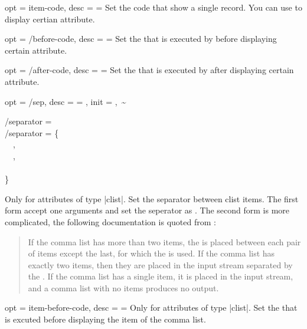 \documentclass[full]{l3doc}
\begin{document}
\begin{documentation}
\begin{option}{
  opt = item-code,
  desc = {= }
}
  Set the code that show a single record. You can use  to display
  certian attribute.
\end{option}

\begin{option}{
  opt = {/before-code},
  desc = {= }
}
  Set the  that is executed by  before displaying
  certain attribute.
\end{option}

\begin{option}{
  opt = {/after-code},
  desc = {= }
}
  Set the  that is executed by  after displaying
  certain attribute.
\end{option}

\begin{option}{
  opt = {/sep},
  desc = {= },
  init = {,~\~}
}
\begin{Syntax}
  /separator =  \\
  /separator = \{ \\
  ~~, \\
  ~~, \\
  ~~ \\
  \}
\end{Syntax}

  Only for attributes of type |clist|. Set the separator between clist items.
  The first form accept one arguments and set the seperator as . The
  second form is more complicated, the following documentation is quoted from
  :
  \begin{quote}
    If the comma list has more than two items, the  is placed between each pair of items except the last, for
    which the  is used. If the comma list
    has exactly two items, then they are placed in the input stream separated
    by the . If the comma list has a single item,
    it is placed in the input stream, and a comma list with no items produces
    no output.
  \end{quote}

\end{option}

\begin{option}{
  opt = item-before-code,
  desc = {= }
}
  Only for attributes of type |clist|. Set the  that is
  excuted before displaying the item of the comma list.
\end{option}


\end{documentation}
\end{document}
